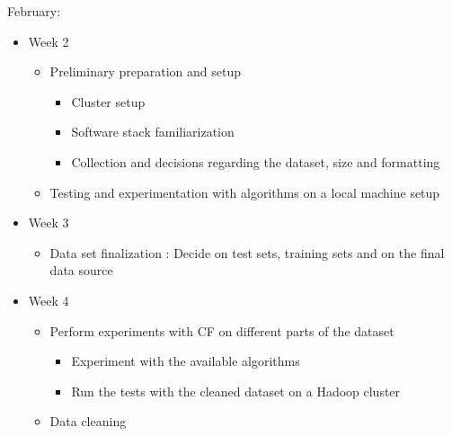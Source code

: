 \documentclass[12pt]{article} %
\begin{document}
February:
\begin{itemize}
\item Week 2
	\begin{itemize}
	\item Preliminary preparation and setup
		\begin{itemize}
		\item Cluster setup
		\item Software stack familiarization
		\item Collection and decisions regarding the dataset, size and formatting
		\end{itemize}
	\item Testing and experimentation with algorithms on a local machine setup
	\end{itemize}
\item Week 3
	\begin{itemize}
	\item Data set finalization : Decide on test sets, training sets and on the final data source
	\end{itemize}
\item Week 4
	\begin{itemize}
	\item Perform experiments with CF on different parts of the dataset
		\begin{itemize}
		\item Experiment with the available algorithms
		\item Run the tests with the cleaned dataset on a Hadoop cluster
		\end{itemize}
	\item Data cleaning
	\end{itemize}
\end{itemize}
\end{document}
